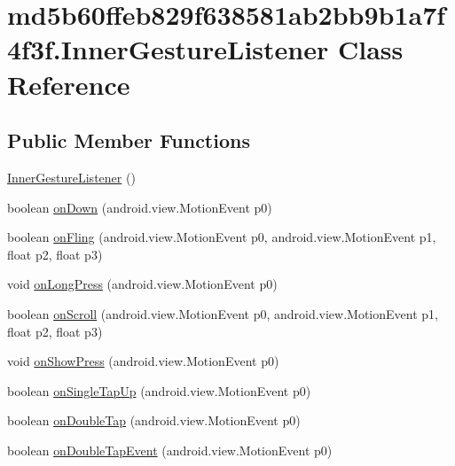 \hypertarget{classmd5b60ffeb829f638581ab2bb9b1a7f4f3f_1_1_inner_gesture_listener}{
\section{md5b60ffeb829f638581ab2bb9b1a7f4f3f.InnerGestureListener Class Reference}
\label{classmd5b60ffeb829f638581ab2bb9b1a7f4f3f_1_1_inner_gesture_listener}
}
\subsection*{Public Member Functions}
\begin{CompactItemize}
\item 
\hyperlink{classmd5b60ffeb829f638581ab2bb9b1a7f4f3f_1_1_inner_gesture_listener_be1b110ec86e9c10eaad079eb73d1352}{InnerGestureListener} ()
\item 
boolean \hyperlink{classmd5b60ffeb829f638581ab2bb9b1a7f4f3f_1_1_inner_gesture_listener_040c94c7721114d95025411a4eed94ff}{onDown} (android.view.MotionEvent p0)
\item 
boolean \hyperlink{classmd5b60ffeb829f638581ab2bb9b1a7f4f3f_1_1_inner_gesture_listener_1756e2693a60f1d3742380e89f01051f}{onFling} (android.view.MotionEvent p0, android.view.MotionEvent p1, float p2, float p3)
\item 
void \hyperlink{classmd5b60ffeb829f638581ab2bb9b1a7f4f3f_1_1_inner_gesture_listener_6ba34beec4f15b2b99e347516a70bf48}{onLongPress} (android.view.MotionEvent p0)
\item 
boolean \hyperlink{classmd5b60ffeb829f638581ab2bb9b1a7f4f3f_1_1_inner_gesture_listener_cc5b84dc58658cb693ceb013d18483d0}{onScroll} (android.view.MotionEvent p0, android.view.MotionEvent p1, float p2, float p3)
\item 
void \hyperlink{classmd5b60ffeb829f638581ab2bb9b1a7f4f3f_1_1_inner_gesture_listener_4a73104a37519a590fd0d475acd83095}{onShowPress} (android.view.MotionEvent p0)
\item 
boolean \hyperlink{classmd5b60ffeb829f638581ab2bb9b1a7f4f3f_1_1_inner_gesture_listener_de097b243cdda0818112d29738cad2ae}{onSingleTapUp} (android.view.MotionEvent p0)
\item 
boolean \hyperlink{classmd5b60ffeb829f638581ab2bb9b1a7f4f3f_1_1_inner_gesture_listener_8c613557a8dfb0a91caaf5e981d6958f}{onDoubleTap} (android.view.MotionEvent p0)
\item 
boolean \hyperlink{classmd5b60ffeb829f638581ab2bb9b1a7f4f3f_1_1_inner_gesture_listener_4fb3a871dc13a6a2394ece055ec3ca5e}{onDoubleTapEvent} (android.view.MotionEvent p0)

\end{CompactItemize}
